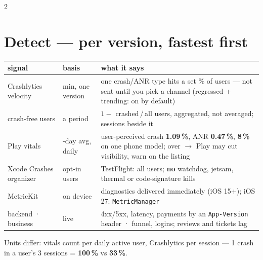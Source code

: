 \documentclass[8pt]{extarticle}
\newcommand\ct[1]{\texttt{#1}}
\begin{document}
\begin{multicols}{2}
\small{}\raggedright

\section{Detect — per version, fastest first}
{\footnotesize\setlength{\tabcolsep}{2.5pt}
\begin{tabular}{@{}>{\raggedright\arraybackslash}p{15mm}>{\raggedright\arraybackslash}p{11mm}>{\raggedright\arraybackslash}p{49mm}@{}}
\toprule
\textbf{signal} & \textbf{basis} & \textbf{what it says}\\ \midrule
Crashlytics velocity & 30 min, one version & one crash/ANR type hits a set \% of users — not sent until you pick a
  channel (regressed + trending: on by default)\\
crash-free users & a period & $1 -$ crashed\,/\,all users, aggregated, not averaged; sessions beside it\\
Play vitals & 28-day avg, daily & user-perceived crash \textbf{1.09\,\%}, ANR \textbf{0.47\,\%}, \textbf{8\,\%}
  on one phone model; over $\to$ Play may cut visibility, warn on the listing\\
Xcode Crashes organizer & opt-in users & TestFlight: all users; \textbf{no} watchdog, jetsam, thermal or
  code-signature kills\\
MetricKit & on device & diagnostics delivered immediately (iOS 15+); iOS 27: \ct{MetricManager}\\
backend · business & live & 4xx/5xx, latency, payments by an \ct{App-Version} header · funnel, logins; reviews and
  tickets lag\\
\bottomrule
\end{tabular}}\par
Units differ: vitals count per daily active user, Crashlytics per session — 1 crash in a user's 3 sessions =
\textbf{100\,\%} vs \textbf{33\,\%}.


\end{multicols}
\end{document}

